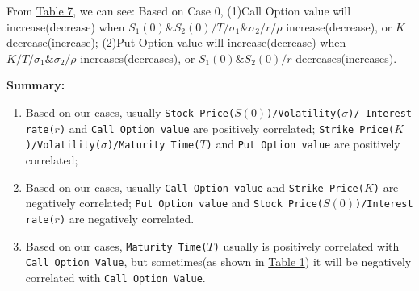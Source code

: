 \documentclass[11pt,a4paper]{article}
\begin{document}
    

    From \hyperref[T7]{Table 7}, we can see: Based on Case 0, 
    (1)Call Option value will increase(decrease) when
    $ S_1(0)\&S_2(0) /  T / \sigma_1 \& \sigma_2 / r / \rho$ 
    increase(decrease), or $ K$ decrease(increase); 
    (2)Put Option value will increase(decrease) when
    $ K / T / \sigma_1\&\sigma_2 / \rho$ increases(decreases), 
    or $ S_1(0)\&S_2(0) / r$ decreases(increases).


    \textbf{Summary:}
    \begin{enumerate}[(1)]
    \item Based on our cases, usually
    \texttt{Stock Price($S(0)$)/Volatility($\sigma$)/ 
    Interest rate($r$)}
    and \texttt{Call Option value}
    are positively correlated;
    \texttt{Strike Price($K$)/Volatility($\sigma$)/Maturity Time($T$)}
    and \texttt{Put Option value}
    are positively correlated;

    \item Based on our cases, usually
    \texttt{Call Option value} and 
    \texttt{Strike Price($K$)}
    are negatively correlated;
    \texttt{Put Option value} and 
    \texttt{Stock Price($S(0)$)/Interest rate($r$)}
    are negatively correlated.

    \item Based on our cases,
    \texttt{Maturity Time($T$)} usually is 
    positively correlated with \texttt{Call Option Value},
    but sometimes(as shown in \hyperref[T1]{Table 1}) 
    it will be 
    negatively correlated with \texttt{Call Option Value}.
    \end{enumerate}
\end{document}
